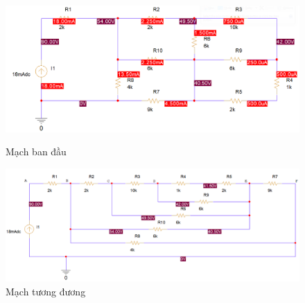 \begin{figure}[!htbp]
    \centering
    \includegraphics[width=1\textwidth]{graphics/ex3/f3.PNG}
    \caption{Mạch ban đầu}
    \includegraphics[width=1\textwidth]{graphics/ex3/f4.PNG}
    \caption{Mạch tương đương}
\end{figure}

